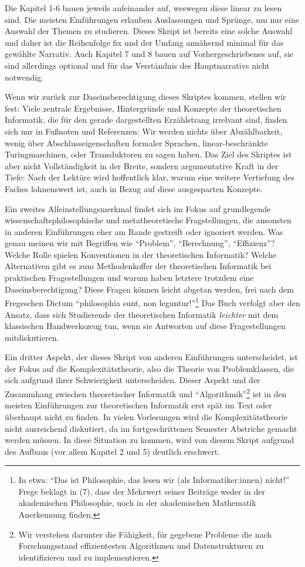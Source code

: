 Die Kapitel 1-6 bauen jeweils aufeinander auf,
weswegen diese linear zu lesen sind.
Die meisten Einführungen erlauben Auslassungen und Sprünge,
um nur eine Auswahl der Themen zu studieren.
Dieses Skript ist bereits eine solche Auswahl
und daher ist die Reihenfolge fix
und der Umfang annähernd minimal für das gewählte Narrativ.
Auch Kapitel 7 und 8 bauen auf Vorhergeschriebenes auf,
sie sind allerdings optional
und für das Verständnis des Hauptnarrativs nicht notwendig.

Wenn wir zurück zur Daseinsberechtigung dieses Skriptes kommen,
stellen wir fest:
Viele zentrale Ergebnisse, Hintergründe und Konzepte
der theoretischen Informatik,
die für den gerade dargestellten Erzählstrang irrelvant sind,
finden sich nur in Fußnoten und Referenzen:
Wir werden nichts über Abzählbarkeit,
wenig über Abschlusseigenschaften formaler Sprachen,
linear-beschränkte Turingmaschinen,
oder Transduktoren zu sagen haben.
Das Ziel des Skriptes ist aber nicht Vollständigkeit in der Breite,
sondern argumentative Kraft in der Tiefe:
Nach der Lektüre wird hoffentlich klar,
warum eine weitere Vertiefung des Faches lohnenswert ist,
auch in Bezug auf diese ausgesparten Konzepte.

Ein zweites Alleinstellungsmerkmal findet sich im Fokus auf grundlegende
wissenschaftsphilosophische und metatheoretische Fragstellungen,
die ansonsten in anderen Einführungen eher am Rande gestreift
oder ignoriert werden.
Was genau meinen wir mit Begriffen wie ``Problem'', ``Berechnung'', ``Effizienz''?
Welche Rolle spielen Konventionen in der theoretischen Informatik?
Welche Alternativen gibt es zum Methodenkoffer der theoretischen Informatik
bei praktischen Fragestellungen
und warum haben letztere trotzdem eine Daseinsberechtigung?
Diese Fragen können leicht abgetan werden, frei nach dem Fregeschen Dictum
``philosophia sunt, non leguntur!''\footnote{
    In etwa: ``Das ist Philosophie,
    das lesen wir (als Informatiker:innen) nicht!''
    Frege beklagt in \cite{frege_grundgesetze} (7),
    dass der Mehrwert seiner Beiträge weder in der akademischen Philosophie,
    noch in der akademischen Mathematik Anerkennung finden.
}
Das Buch verfolgt aber den Ansatz,
dass sich Studierende der theoretischen Informatik
\emph {leichter} mit dem klassischen Handwerkszeug tun,
wenn sie Antworten auf diese Fragestellungen mitdiskutieren.

Ein dritter Aspekt, der dieses Skript von anderen Einführungen unterscheidet,
ist der Fokus auf die Komplexitätstheorie,
also die Theorie von Problemklassen,
die sich aufgrund ihrer Schwierigkeit unterscheiden.
Dieser Aspekt und der Zusammhang zwischen theoretischer Informatik und ``Algorithmik''\footnote{
    Wir verstehen darunter die Fähigkeit,
    für gegebene Probleme die nach Forschungsstand
    effizientesten Algorithmen und Datenstrukturen zu identifizieren
    und zu implementieren.}
ist in den meisten Einführungen zur theoretischen Informatik
erst spät im Text oder überhaupt nicht zu finden.
In vielen Vorlesungen wird die Komplexitätstheorie nicht ausreichend diskutiert,
da im fortgeschrittenen Semester Abstriche gemacht werden müssen.
In diese Situation zu kommen, wird von diesem Skript aufgrund des Aufbaus
(vor allem Kapitel 2 und 5) deutlich erschwert.

